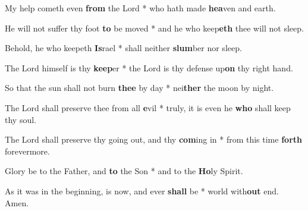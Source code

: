 \begin{multicols}{2}
	My help cometh even \textbf{from} the Lord * who hath made \textbf{hea}ven and earth.
	
	He will not suffer thy foot \textbf{to} be moved * and he who keep\textbf{eth} thee will not sleep.
	
	Behold, he who keepeth \textbf{Is}rael * shall neither \textbf{slum}ber nor sleep.
	
	The Lord himself is thy \textbf{keep}er * the Lord is thy defense up\textbf{on} thy right hand.
	
	So that the sun shall not burn \textbf{thee} by day * nei\textbf{ther} the moon by night.
	
	The Lord shall preserve thee from all \textbf{e}vil * truly, it is even he \textbf{who} shall keep thy soul.
	
	The Lord shall preserve thy going out, and thy \textbf{com}ing in * from this time \textbf{forth} forevermore.
	
	Glory be to the Father, and \textbf{to} the Son * and to the \textbf{Ho}ly Spirit.
	
	As it was in the beginning, is now, and ever \textbf{shall} be * world with\textbf{out} end. Amen.
\end{multicols}